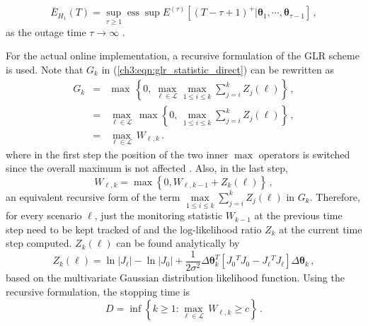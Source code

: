 \begin{equation}
\overline{E}_{H_1}(T)=\sup _{\tau \geq 1} \operatorname{ess} \sup E^{(\tau)}\left[(T-\tau+1)^{+} | \boldsymbol{\theta}_{1}, \cdots, \boldsymbol{\theta}_{\tau-1}\right] \,,
\end{equation} as the outage time $\tau \to \infty$ \cite{Lai1998}.

For the actual online implementation, a recursive formulation of the GLR scheme is used. Note that $G_k$ in (\ref{ch3:eqn:glr_statistic_direct}) can be rewritten as 
\begin{eqnarray}
G_k &=& \max \, \left\lbrace  0,  \, \underset{\ell \in \mathcal{L}}{\max} \underset{1\le i \le k}{\max} \sum_{j=i}^{k} Z_{j}(\ell)  \right\rbrace\,, \nonumber\\
    &=& \underset{\ell \in \mathcal{L}}{\max} \, \max \left\lbrace  0,  \, \underset{1\le i \le k}{\max} \sum_{j=i}^{k} Z_{j}(\ell)  \right\rbrace\,,\nonumber \\
    &=& \underset{\ell \in \mathcal{L}}{\max}  \,  W_{\ell, k} \,.
\end{eqnarray} 
where in the first step the position of the two inner $\max$ operators is switched since the overall maximum is not affected \cite{Mei2010}. Also, in the last step,
\begin{equation}
\label{ch3:eqn:glr_statistics}
W_{\ell, k} = \max \left\lbrace  0, W_{\ell, k-1} + Z_k(\ell) \right\rbrace \,,
\end{equation}
an equivalent recursive form of the term $\underset{1\le i \le k}{\max} \sum_{j=i}^{k} Z_{j}(\ell) $ in $G_k$. Therefore, for every scenario $\ell$, just the monitoring statistic $W_{k-1}$ at the previous time step need to be kept tracked of and the log-likelihood ratio $Z_k$ at the current time step computed. $Z_k(\ell)$ can be found analytically by
\begin{equation}
\label{ch3:eqn:log_likelihood_explicit}
Z_k(\ell) = \ln\left| {J}_\ell \right| - \ln\left| {J}_0 \right| + \frac{1}{2\sigma^2} \Delta\boldsymbol{\theta}_k^{T} \left[ {J}_0{^T}  {J}_0 - {J}_\ell{^T} {J}_\ell \right] \Delta\boldsymbol{\theta}_k \,,
\end{equation} based on the multivariate Gaussian distribution likelihood function. Using the recursive formulation, the stopping time is
\begin{equation}
\label{ch3:eqn:stopping_rule}
    D = \inf \left\lbrace  k \ge 1: \underset{\ell \in \mathcal{L}}{\max} \, W_{\ell, k} \ge c \right\rbrace \,.
\end{equation}

